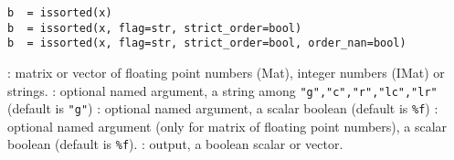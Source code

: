 
\begin{mandesc}
\end{mandesc}

\begin{calling_sequence}
\begin{verbatim}
b  = issorted(x)
b  = issorted(x, flag=str, strict_order=bool)
b  = issorted(x, flag=str, strict_order=bool, order_nan=bool)
\end{verbatim}
\end{calling_sequence}
\begin{parameters}
  \begin{varlist}
    :  matrix or vector of floating point numbers (Mat), integer numbers (IMat) or strings.
    : optional named argument, a string among
    \verb+"g","c","r","lc","lr"+ (default is \verb+"g"+)
    : optional named argument, a scalar boolean (default is \verb+%f+)
    : optional named argument (only for matrix of floating point numbers), a scalar boolean (default is \verb+%f+).
    : output, a boolean scalar or vector.
  \end{varlist}
\end{parameters}


